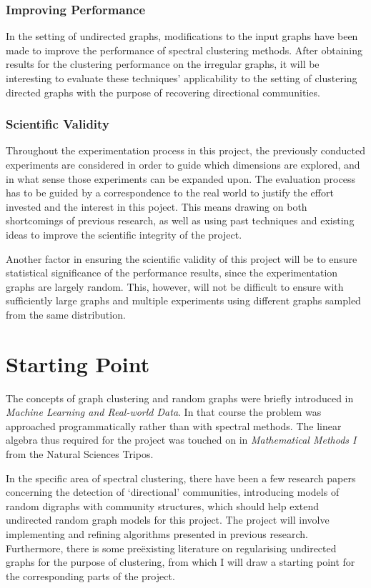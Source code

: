 \subsubsection{Improving Performance}
In the setting of undirected graphs, modifications to the input graphs have been made to improve the
performance of spectral clustering methods. After obtaining results for the clustering performance 
on the irregular graphs, it will be interesting to evaluate these techniques' applicability to 
the setting of clustering directed graphs with the purpose of recovering directional communities.

\subsubsection{Scientific Validity}
Throughout the experimentation process in this project, the previously conducted experiments are
considered in order to guide which dimensions are explored, and in what sense those experiments can
be expanded upon. The evaluation process has to be guided by a correspondence to
the real world to justify the effort invested and the interest in this poject. This means drawing 
on both shortcomings of previous research, as well as using past techniques and existing ideas to
improve the scientific integrity of the project.

Another factor in ensuring the scientific validity of this project will be to ensure statistical 
significance of the performance results, since the experimentation graphs are largely random. This,
however, will not be difficult to ensure with sufficiently large graphs and multiple experiments 
using different graphs sampled from the same distribution.

\section{Starting Point}
The concepts of graph clustering and random graphs were briefly 
introduced in \emph{Machine Learning and Real-world Data}. In that 
course the problem was approached programmatically rather than with 
spectral methods. The linear algebra thus required for the project was touched on in \emph{Mathematical Methods I} from the Natural Sciences Tripos.

In the specific area of spectral clustering, there have been a few research papers 
concerning the detection of `directional' communities, introducing models of random 
digraphs with community structures, which should help extend undirected random graph models for this project. 
The project will involve implementing and refining algorithms presented in previous research. 
Furthermore, there is some pre\"existing literature on regularising undirected graphs for 
the purpose of clustering, 
from which I will draw a starting point for the corresponding 
parts of the project.
